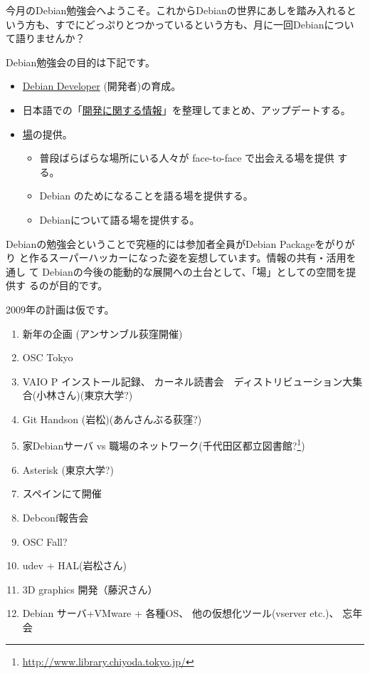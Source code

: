 \documentclass[mingoth,a4paper]{jsarticle}
\begin{document}

\begin{multicols}{2}
 
 
 今月のDebian勉強会へようこそ。これからDebianの世界にあしを踏み入れると
 いう方も、すでにどっぷりとつかっているという方も、月に一回Debianについ
 て語りませんか？

 Debian勉強会の目的は下記です。

 \begin{itemize}
 \item \underline{Debian Developer} (開発者)の育成。
 \item 日本語での「\underline{開発に関する情報}」を整理してまとめ、アップデートする。
 \item \underline{場}の提供。
 \begin{itemize}
  \item 普段ばらばらな場所にいる人々が face-to-face で出会える場を提供
	する。
  \item Debian のためになることを語る場を提供する。
  \item Debianについて語る場を提供する。
 \end{itemize}
 \end{itemize}		

 Debianの勉強会ということで究極的には参加者全員がDebian Packageをがりがり
 と作るスーパーハッカーになった姿を妄想しています。情報の共有・活用を通し
 て Debianの今後の能動的な展開への土台として、「場」としての空間を提供す
 るのが目的です。

 2009年の計画は仮です。

 \begin{enumerate}
  \item 新年の企画 (アンサンブル荻窪開催)
  \item OSC Tokyo
  \item VAIO P インストール記録、
	カーネル読書会　ディストリビューション大集合(小林さん)(東京大学?)
  \item Git Handson (岩松)(あんさんぶる荻窪?)
  \item 家Debianサーバ vs 職場のネットワーク(千代田区都立図書館?\footnote{\url{http://www.library.chiyoda.tokyo.jp/}})
  \item Asterisk (東京大学?)
  \item スペインにて開催
  \item Debconf報告会
  \item OSC Fall?
  \item udev + HAL(岩松さん)
  \item 3D graphics 開発（藤沢さん） 
  \item Debian サーバ+VMware + 各種OS、
	他の仮想化ツール(vserver etc.)、
	忘年会
 \end{enumerate}


\end{multicols}
\end{document}
